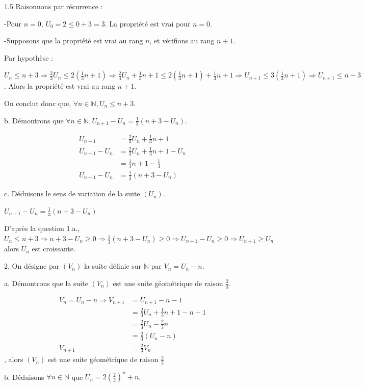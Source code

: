 \documentclass[12pt]{article}
\begin{document}
\begin{spacing}{1.5}
Raisonnons par récurrence :

-Pour $n=0$, $U_0=2\leq 0+3=3$. La propriété est vrai pour $n=0$.

-Supposons que la propriété est vrai au rang $n$, et vérifions au rang $n+1$.

Par hypothèse :

$U_n\leq n+3\Rightarrow \frac{2}{3}U_n\leq 2(\frac{1}{3}n+1)\Rightarrow \frac{2}{3}U_n+\frac{1}{3}n + 1\leq 2(\frac{1}{3}n+1)+\frac{1}{3}n + 1\Rightarrow U_{n+1}\leq 3(\frac{1}{3}n + 1)\Rightarrow U_{n+1}\leq n+3$. Alors la propriété est vrai au rang $n+1$.

On conclut donc que, $\forall n\in \mathbb{N}, U_n\leq n+3$.


b. Démontrons que $\forall {n\in \mathbb{N}}, U_{n+1} - U_n = \frac{1}{3}(n+3-U_n)$.

\begin{align*}
U_{n+1} &= \frac{2}{3}U_n + \frac{1}{3}n + 1\\
U_{n+1}-U_n &= \frac{2}{3}U_n + \frac{1}{3}n + 1-U_n\\
&=\frac{1}{3}n + 1-\frac{1}{3}\\
U_{n+1}-U_n &=\frac{1}{3}(n + 3-U_n)
\end{align*}

c. Déduisons le sens de variation de la suite $(U_n)$.

$U_{n+1}-U_n =\frac{1}{3}(n + 3-U_n)$

D'après la question 1.a., $U_n\leq n+3\Rightarrow n + 3-U_n\geq 0 \Rightarrow \frac{1}{3}(n + 3-U_n)\geq 0\Rightarrow U_{n+1}-U_n \geq 0\Rightarrow U_{n+1}\geq U_n$ alors $U_n$ est croissante.

2. On désigne par $(V_n)$ la suite définie sur $\mathbb{N}$ par $V_n =U_n-n$.

a. Démontrons que la suite $(V_n)$ est une suite géométrique de raison $\frac{2}{3}$.

\begin{align*}
V_n =U_n-n\Rightarrow V_{n+1} &=U_{n+1}-n-1\\
&=\frac{2}{3}U_n + \frac{1}{3}n + 1-n-1\\
&=\frac{2}{3}U_n - \frac{2}{3}n\\
&=\frac{2}{3}(U_n-n)\\
V_{n+1} &=\frac{2}{3}V_n
\end{align*}, alors $(V_n)$ est une suite géométrique de raison $\frac{2}{3}$


b. Déduisons $\forall {n\in \mathbb{N}}$ que $U_n = 2(\frac{2}{3})^n + n$.


\end{spacing}
\end{document}
